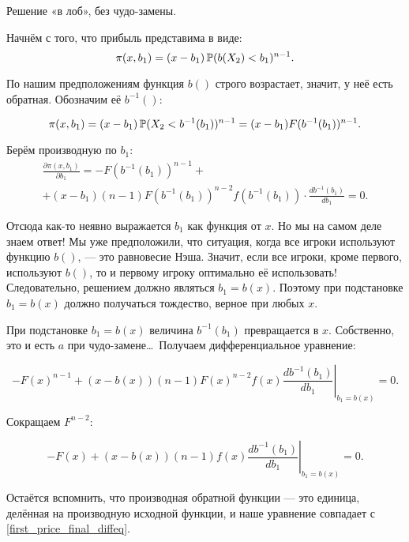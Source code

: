 \begin{enumerate}
\begin{myex} Решение «в лоб», без чудо-замены.

Начнём с того, что прибыль представима в виде:
\begin{equation}
\pi(x,b_{1})=(x-b_{1})\P(b(X_{2})<b_{1})^{n-1}.
\end{equation}

По нашим предположениям функция $ b() $ строго возрастает, значит, у неё есть обратная. Обозначим её $ b^{-1}() $:

\begin{equation}
\pi(x,b_{1})=(x-b_{1})\P(X_{2}<b^{-1}(b_{1}))^{n-1}=(x-b_{1})F(b^{-1}(b_{1}))^{n-1}.
\end{equation}

Берём производную по $ b_{1} $:
\begin{multline}
\frac{\partial \pi(x,b_{1})}{\partial b_{1}}=-F(b^{-1}(b_{1}))^{n-1}+\\
+(x-b_{1})(n-1)F(b^{-1}(b_{1}))^{n-2}f(b^{-1}(b_{1}))\cdot \frac{db^{-1}(b_{1})}{db_{1}}=0.
\end{multline}

Отсюда как-то неявно выражается $ b_{1} $ как функция от $ x $. Но мы на самом деле знаем ответ! Мы уже предположили, что ситуация, когда все игроки используют функцию $b()$, — это равновесие Нэша. Значит, если все игроки, кроме первого, используют $ b() $, то и первому игроку оптимально её использовать! Следовательно, решением должно являться $b_{1}=b(x)$. Поэтому при подстановке $b_{1}=b(x)$ должно получаться тождество, верное при любых $ x $.

При подстановке $ b_{1}=b(x) $ величина $ b^{-1}(b_{1}) $ превращается в $x$. Собственно, это и есть $ a $ при чудо-замене\ldots~Получаем дифференциальное уравнение:

\begin{equation}
-F(x)^{n-1}+(x-b(x))(n-1)F(x)^{n-2}f(x)\left.\frac{db^{-1}(b_{1})}{db_{1}}\right|_{b_{1}=b(x)}=0.
\end{equation}

Сокращаем $ F^{n-2} $:

\begin{equation}
-F(x)+(x-b(x))(n-1)f(x)\left.\frac{db^{-1}(b_{1})}{db_{1}}\right|_{b_{1}=b(x)}=0.
\end{equation}

Остаётся вспомнить, что производная обратной функции — это единица, делённая на производную исходной функции, и наше уравнение совпадает с \ref{first_price_final_diffeq}.
\end{myex}


\end{enumerate}
